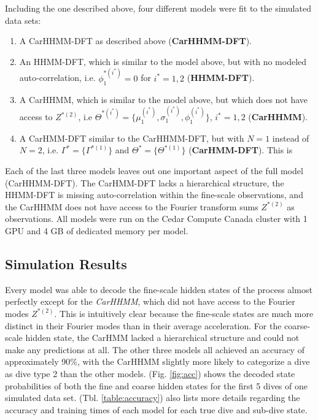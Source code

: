 Including the one described above, four different models were fit to the simulated data sets:

\begin{enumerate}
    \item A CarHHMM-DFT as described above (\textbf{CarHHMM-DFT}).
    \item An HHMM-DFT, which is similar to the model above, but with no modeled auto-correlation, i.e. $\phi_1^{*(i^*)} = 0$ for $i^* = 1,2$ (\textbf{HHMM-DFT}).
    \item A CarHHMM, which is similar to the model above, but which does not have access to $Z^{*(2)}$, i.e $\Theta^{*(i^*)} = \{\mu_1^{(i^*)},\sigma_1^{(i^*)},\phi_1^{(i^*)}\}$, $i^* = 1,2$ (\textbf{CarHHMM}).
    \item A CarHMM-DFT similar to the CarHHMM-DFT, but with $N=1$ instead of $N=2$, i.e. $\Gamma^* = \{\Gamma^{*(1)}\}$ and $\Theta^* = \{\Theta^{*(1)}\}$ (\textbf{CarHMM-DFT}). This is 
\end{enumerate}
%
Each of the last three models leaves out one important aspect of the full model (CarHHMM-DFT). The CarHMM-DFT lacks a hierarchical structure, the HHMM-DFT is missing auto-correlation within the fine-scale observations, and the CarHHMM does not have access to the Fourier transform sums $Z^{*(2)}$ as observations. All models were run on the Cedar Compute Canada cluster with 1 GPU and 4 GB of dedicated memory per model.

\subsection{Simulation Results}

Every model was able to decode the fine-scale hidden states of the process almost perfectly except for the \textit{CarHHMM}, which did not have access to the Fourier modes $Z^{*(2)}$. This is intuitively clear because the fine-scale states are much more distinct in their Fourier modes than in their average acceleration. For the coarse-scale hidden state, the CarHMM lacked a hierarchical structure and could not make any predictions at all. The other three models all achieved an accuracy of approximately 90\%, with the CarHHMM slightly more likely to categorize a dive as dive type 2 than the other models. (Fig. \ref{fig:acc}) shows the decoded state probabilities of both the fine and coarse hidden states for the first 5 dives of one simulated data set. (Tbl. \ref{table:accuracy}) also lists more details regarding the accuracy and training times of each model for each true dive and sub-dive state.

